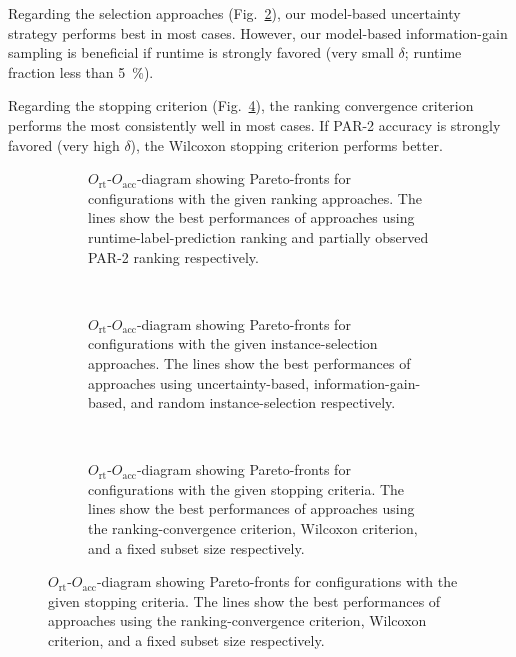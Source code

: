 \documentclass[runningheads]{llncs}
\begin{document}
Regarding the selection approaches (Fig.~\ref{fig:annitraincolorselection}), our model-based uncertainty strategy performs best in most cases.
However, our model-based information-gain sampling is beneficial if runtime is strongly favored (very small $\delta$; runtime fraction less than \SI{5}{\%}).

Regarding the stopping criterion (Fig.~\ref{fig:annitraincolorstopping}), the ranking convergence criterion performs the most consistently well in most cases.
If PAR-2 accuracy is strongly favored (very high $\delta$), the Wilcoxon stopping criterion performs better.

\begin{figure}[tbp!]
  \centering
  \begin{subfigure}{1.0\textwidth}
    \caption{$O_{\operatorname{rt}}$-$O_{\operatorname{acc}}$-diagram showing Pareto-fronts for configurations with the given ranking approaches. The lines show the best performances of approaches using runtime-label-prediction ranking and partially observed PAR-2 ranking respectively.}
    \label{fig:annitraincolorranking}
  \end{subfigure}
  \\
  \vspace{0.2cm}
  \begin{subfigure}{1.0\textwidth}
    \caption{$O_{\operatorname{rt}}$-$O_{\operatorname{acc}}$-diagram showing Pareto-fronts for configurations with the given instance-selection approaches. The lines show the best performances of approaches using uncertainty-based, information-gain-based, and random instance-selection respectively.}
    \label{fig:annitraincolorselection}
  \end{subfigure}
  \\
  \vspace{0.2cm}
  \begin{subfigure}{1.0\textwidth}
    \caption{$O_{\operatorname{rt}}$-$O_{\operatorname{acc}}$-diagram showing Pareto-fronts for configurations with the given stopping criteria. The lines show the best performances of approaches using the ranking-convergence criterion, Wilcoxon criterion, and a fixed subset size respectively.}
    \label{fig:annitraincolorstopping}
  \end{subfigure}


\end{figure}
\end{document}
